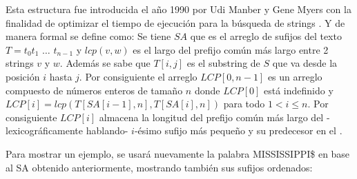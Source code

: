Esta estructura fue introducida el año 1990 por Udi Manber y Gene Myers con la finalidad de optimizar el tiempo de ejecución para la búsqueda de strings \cite{suffixarray1}. Y de manera formal se define como: Se tiene $SA$ que es el arreglo de sufijos del texto $T=t_{0}t_{1}$ $\ldots$ $t_{n-1}$ y $lcp(v,w)$ es el largo del prefijo común más largo entre 2 strings $v$ y $w$. Además se sabe que $T[i,j]$ es el substring de $S$ que va desde la posición $i$ hasta $j$. Por consiguiente el arreglo $LCP[0,n-1]$ es un arreglo compuesto de números enteros de tamaño $n$ donde $LCP[0]$ está indefinido y $LCP[i] = lcp(T[SA[i-1],n], T[SA[i],n])$ para todo $1 < i \leq n$. Por consiguiente $LCP[i]$ almacena la longitud del prefijo común más largo del -lexicográficamente hablando-  $i$-ésimo sufijo más pequeño y su predecesor en el \cite{suffix array}.

Para mostrar un ejemplo, se usará nuevamente la palabra MISSISSIPPI\$ en base al SA obtenido anteriormente, mostrando también sus sufijos ordenados:

